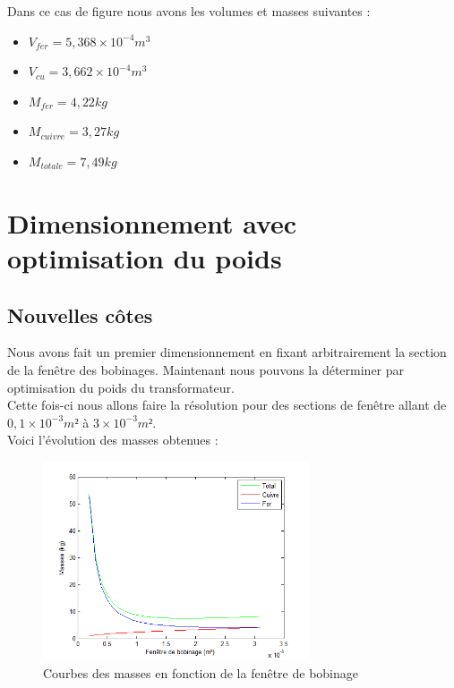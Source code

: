 Dans ce cas de figure nous avons les volumes et masses suivantes : \\
\begin{itemize}
\item $V_{fer} = 5,368 \times{}10^{-4} m^3$
\item $V_{cu} = 3,662 \times{}10^{-4} m^3$
\item $M_{fer} = 4,22 kg$
\item $M_{cuivre} = 3,27 kg $
\item $M_{totale} = 7,49 kg $
\end{itemize}

\section{Dimensionnement avec optimisation du poids}
\subsection{Nouvelles côtes}
Nous avons fait un premier dimensionnement en fixant arbitrairement la section  de la fenêtre des bobinages. Maintenant nous pouvons la déterminer par optimisation du poids du transformateur.\\
Cette fois-ci nous allons faire la résolution pour des sections de fenêtre allant de $0,1\times{}10^{-3} m²$ à $3\times{}10^{-3} m²$.\\

Voici l'évolution des masses obtenues : 
\begin{figure}
	\begin{center}
	\includegraphics[width=0.7\textwidth]{images/TP1_plot_masses}
	\caption{Courbes des masses en fonction de la fenêtre de bobinage}\label{img:plotMasses}
	\end{center}
\end{figure}
\FloatBarrier 


